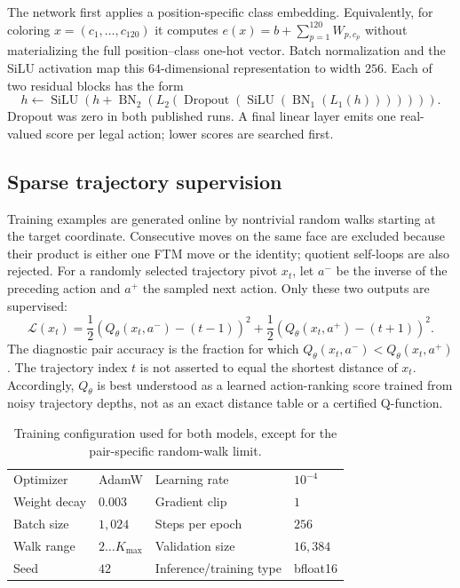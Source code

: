 The network first applies a position-specific class embedding.  Equivalently,
for coloring $x=(c_1,\ldots,c_{120})$ it computes
\(
 e(x)=b+\sum_{p=1}^{120}W_{p,c_p}
\)
without materializing the full position--class one-hot vector.  Batch
normalization and the SiLU activation map this $64$-dimensional representation
to width $256$.  Each of two residual blocks has the form
\[
 h\leftarrow\operatorname{SiLU}\!\left(
 h+\operatorname{BN}_2\!\left(L_2(
 \operatorname{Dropout}(\operatorname{SiLU}(\operatorname{BN}_1(L_1(h)))))
 \right)\right).
\]
Dropout was zero in both published runs.  A final linear layer emits one
real-valued score per legal action; lower scores are searched first.

\subsection{Sparse trajectory supervision}
\label{sec:sparse-supervision}

Training examples are generated online by nontrivial random walks starting at
the target coordinate.  Consecutive moves on the same face are excluded
because their product is either one FTM move or the identity; quotient
self-loops are also rejected.  For a randomly selected trajectory pivot $x_t$,
let $a^-$ be the inverse of the preceding action and $a^+$ the sampled next
action.  Only these two outputs are supervised:
\begin{equation}
  \mathcal{L}(x_t)
  =\frac12\left(Q_\theta(x_t,a^-)-(t-1)\right)^2
  +\frac12\left(Q_\theta(x_t,a^+)-(t+1)\right)^2.
  \label{eq:sparse-loss}
\end{equation}
The diagnostic pair accuracy is the fraction for which
$Q_\theta(x_t,a^-)<Q_\theta(x_t,a^+)$.  The trajectory index $t$ is not asserted
to equal the shortest distance of $x_t$.  Accordingly, $Q_\theta$ is best
understood as a learned action-ranking score trained from noisy trajectory
depths, not as an exact distance table or a certified Q-function.

\begin{table}[t]
\centering
\caption{Training configuration used for both models, except for the
pair-specific random-walk limit.}
\label{tab:training-configuration}
\small
\begin{tabular}{@{}ll@{\qquad}ll@{}}
\toprule
Optimizer & AdamW & Learning rate & $10^{-4}$\\
Weight decay & $0.003$ & Gradient clip & $1$\\
Batch size & $1{,}024$ & Steps per epoch & $256$\\
Walk range & $2\ldots K_{\max}$ & Validation size & $16{,}384$\\
Seed & $42$ & Inference/training type & bfloat16\\
\bottomrule
\end{tabular}
\end{table}

